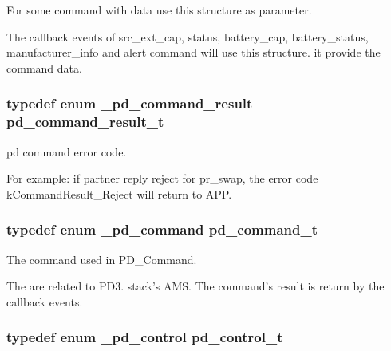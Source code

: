 For some command with data use this structure as parameter. 

The callback events of src\-\_\-ext\-\_\-cap, status, battery\-\_\-cap, battery\-\_\-status, manufacturer\-\_\-info and alert command will use this structure. it provide the command data. \hypertarget{group__usb__pd__stack_ga59917b1485caba4dd8d9b65ca5a5fd92}{
\subsubsection[{pd\-\_\-command\-\_\-result\-\_\-t}]{\setlength{\rightskip}{0pt plus 5cm}typedef enum {\bf \-\_\-pd\-\_\-command\-\_\-result}  {\bf pd\-\_\-command\-\_\-result\-\_\-t}}}\label{group__usb__pd__stack_ga59917b1485caba4dd8d9b65ca5a5fd92}


pd command error code. 

For example\-: if partner reply reject for pr\-\_\-swap, the error code k\-Command\-Result\-\_\-\-Reject will return to A\-P\-P. \hypertarget{group__usb__pd__stack_ga91457cf9522e345a0efa2e2a7424bb0d}{
\subsubsection[{pd\-\_\-command\-\_\-t}]{\setlength{\rightskip}{0pt plus 5cm}typedef enum {\bf \-\_\-pd\-\_\-command}  {\bf pd\-\_\-command\-\_\-t}}}\label{group__usb__pd__stack_ga91457cf9522e345a0efa2e2a7424bb0d}


The command used in P\-D\-\_\-\-Command. 

The are related to P\-D3. stack's A\-M\-S. The command's result is return by the callback events. \hypertarget{group__usb__pd__stack_ga880e41e7aafed69c34035517d1bbb7b6}{
\subsubsection[{pd\-\_\-control\-\_\-t}]{\setlength{\rightskip}{0pt plus 5cm}typedef enum {\bf \-\_\-pd\-\_\-control}  {\bf pd\-\_\-control\-\_\-t}}}\label{group__usb__pd__stack_ga880e41e7aafed69c34035517d1bbb7b6}


